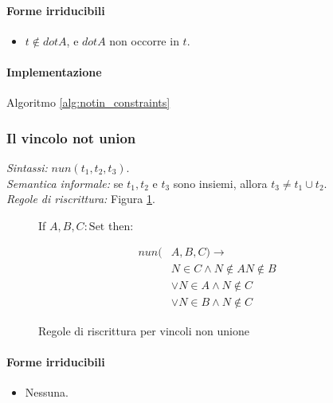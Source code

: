 \documentclass[12pt,a4paper,openright]{book} %
\begin{document}
\paragraph{Forme irriducibili}
\begin{itemize}
	\item $t \not\in dotA$, e $dotA$ non occorre in $t$.
\end{itemize}

\paragraph{Implementazione}
Algoritmo \ref{alg:notin_constraints}

\subsubsection{Il vincolo not union}

\textit{Sintassi:} $nun(t_1,t_2,t_3)$.\\
\noindent\textit{Semantica informale:} se $t_1, t_2$ e $t_3$ sono insiemi, allora $t_3 \neq t_1 \cup t_2$.\\
\noindent\textit{Regole di riscrittura:} Figura \ref{fig:notun_constraints}.

\begin{figure}
	\begin{tcolorbox}[colframe=black, colback=white, sharp corners]
		\setcounter{equation}{13}
		\renewcommand{\theequation}{$\cup$\textsubscript{\arabic{equation}}}
		
		If $A, B, C: \text{Set}$ then:
		
		\begin{equation}
		\begin{split}
		nun(& A,B,C) \to \\
		  & N \in C \land N \not\in A N \not\in B \\
		  & \lor N \in A \land N \not\in C \\
		  & \lor N \in B \land N \not\in C
		\end{split}
		\end{equation}
		
	\end{tcolorbox}
	
	\caption{Regole di riscrittura per vincoli non unione}
	\label{fig:notun_constraints}
\end{figure}

\paragraph{Forme irriducibili}
\begin{itemize}
	\item Nessuna.
\end{itemize}
\end{document}
